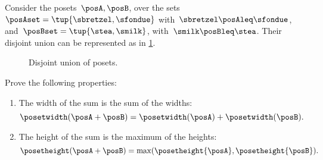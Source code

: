 \begin{example}
    Consider the posets~$\posA,\posB$, over the sets~$\posAset=\tup{\sbretzel, \sfondue}$ with~$\sbretzel \posAleq \sfondue$, and~$\posBset=\tup{\stea,\smilk}$, with~$\smilk \posBleq \stea$.
    Their disjoint union can be represented as in \cref{fig:poset-coproduct}.
    \begin{figure}[h!]
        \centering
        \caption{Disjoint union of posets.}
        \label{fig:poset-coproduct}
    \end{figure}
\end{example}
\vfill
\begin{gradedexercise}
    \label{ex:MeasurePosetSum}
    Prove the following properties:
    \begin{enumerate}
        \item The width of the sum is the sum of the widths:
              \begin{equation}
                  \posetwidth(\posA + \posB) = \posetwidth(\posA) + \posetwidth(\posB).
              \end{equation}
        \item The height of the sum is the maximum of the heights:
              \begin{equation}
                  \posetheight(\posA + \posB) = \max(\posetheight{\posA}, \posetheight{\posB}).
              \end{equation}
    \end{enumerate}
\end{gradedexercise}
